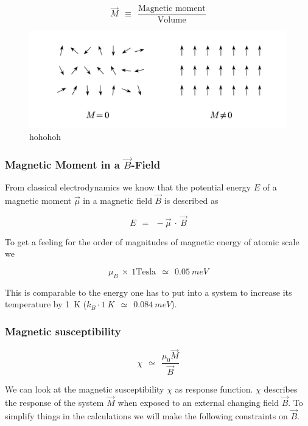 \documentclass[10pt]{report}
\numberwithin{equation}{chapter}
\begin{document}
\begin{equation}
  \vec{M} ~~\equiv~~ \frac{\text{Magnetic moment}}{\text{Volume}}
\end{equation}

\begin{figure}
  \centering
  \includegraphics[width=0.8\linewidth]{../img/mag_in_solid.pdf}
  \caption{hohohoh}
\end{figure}

\subsubsection{Magnetic Moment in a $\vec{B}$-Field}


From classical electrodynamics we know that the potential energy $E$ of a magnetic moment $\vec{\mu}$ in a magnetic field $\vec{B}$ is described as

\begin{equation}
  E ~~=~~ - \vec{\mu} ~\cdot~ \vec{B}
\end{equation}

To get a feeling for the order of magnitudes of magnetic energy of atomic scale we 

\begin{equation*}
  \mu_B ~\times~ 1 \text{Tesla} ~~\simeq~~ \SI{0.05}{meV}
\end{equation*}

This is comparable to the energy one has to put into a system to increase its temperature by \SI[mode=text]{1}{K} ($ k_B \cdot \SI{1}{K} ~~\simeq~~ \SI{0.084}{meV}$).


\subsubsection{Magnetic susceptibility}

\begin{equation} \label{eq:mag_suscept}
  \chi ~~≃~~ \frac{\mu_0 \vec{M}}{\vec{B}}
\end{equation}

We can look at the magnetic susceptibility $\chi$ as response function. $\chi$ describes the response of the system $\vec{M}$ when exposed to an external changing field $\vec{B}$.
To simplify things in the calculations we will make the following constraints on $\vec{B}$.
\end{document}
